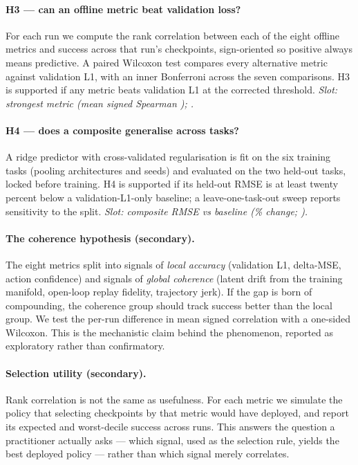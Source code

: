 \paragraph{H3 --- can an offline metric beat validation loss?} For each run we compute the
rank correlation between each of the eight offline metrics and success across that run's
checkpoints, sign-oriented so positive always means predictive. A paired Wilcoxon test
compares every alternative metric against validation L1, with an inner Bonferroni across the
seven comparisons. H3 is supported if any metric beats validation L1 at the corrected
threshold. \emph{Slot: strongest metric \HthreeBest{} (mean signed Spearman
\HthreeBestSpearman{}); \HthreeSupported{}.}

\paragraph{H4 --- does a composite generalise across tasks?} A ridge predictor with
cross-validated regularisation is fit on the six training tasks (pooling architectures and
seeds) and evaluated on the two held-out tasks, locked before training. H4 is supported if its
held-out RMSE is at least twenty percent below a validation-L1-only baseline; a
leave-one-task-out sweep reports sensitivity to the split. \emph{Slot: composite RMSE
\HfourCompRMSE{} vs baseline \HfourBaseRMSE{} (\HfourRel{}\% change; \HfourSupported{}).}

\paragraph{The coherence hypothesis (secondary).} The eight metrics split into signals of
\emph{local accuracy} (validation L1, delta-MSE, action confidence) and signals of
\emph{global coherence} (latent drift from the training manifold, open-loop replay fidelity,
trajectory jerk). If the gap is born of compounding, the coherence group should track success
better than the local group. We test the per-run difference in mean signed correlation with a
one-sided Wilcoxon. This is the mechanistic claim behind the phenomenon, reported as
exploratory rather than confirmatory.

\paragraph{Selection utility (secondary).} Rank correlation is not the same as usefulness. For
each metric we simulate the policy that selecting checkpoints by that metric would have
deployed, and report its expected and worst-decile success across runs. This answers the
question a practitioner actually asks --- which signal, used as the selection rule, yields the
best deployed policy --- rather than which signal merely correlates.


